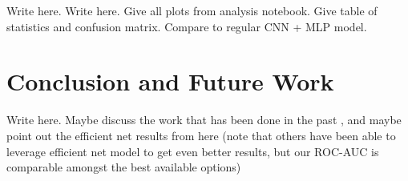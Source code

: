 \documentclass [MAS] {uclathes}
\begin{document}
Write here. Write here. Give all plots from analysis notebook. Give table of statistics and confusion matrix. Compare to regular CNN + MLP model.


\chapter{Conclusion and Future Work}

Write here. Maybe discuss the work that has been done in the past \cite{VariousMethods}, and maybe point out the efficient net results from here \cite{EffNet_MelDet} (note that others have been able to leverage efficient net model to get even better results, but our ROC-AUC is comparable amongst the best available options)



\end{document}
